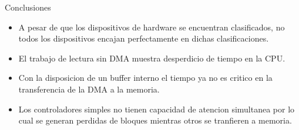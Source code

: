 \documentclass{beamer}
\begin{document}
\begin{frame}{Conclusiones}
\begin{itemize}
    \item A pesar de que los dispositivos de hardware se encuentran clasificados, no todos los dispositivos encajan perfectamente en dichas clasificaciones.
    \item El trabajo de lectura sin DMA muestra desperdicio de tiempo en la CPU.
    \item Con la disposicion de un buffer interno el tiempo ya no es critico en la transferencia de la DMA a la memoria.
    \item Los controladores simples no tienen capacidad de atencion simultanea por lo cual se generan perdidas de bloques mientras otros se tranfieren a memoria.
\end{itemize}
\end{frame}
\end{document}
